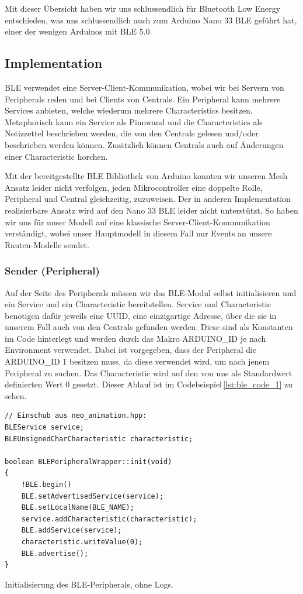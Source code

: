         Mit dieser Übersicht haben wir uns schlussendlich für Bluetooth Low Energy entschieden, was uns schlussendlich auch zum Arduino Nano 33 BLE geführt hat, einer der wenigen Arduinos mit BLE 5.0.

    \subsection{Implementation}

    BLE verwendet eine Server-Client-Kommunikation, wobei wir bei Servern von Peripherals reden und bei Clients von Centrals.
    Ein Peripheral kann mehrere Services anbieten, welche wiederum mehrere Characteristics besitzen. Metaphorisch kann ein Service als Pinnwand und die Characteristics als Notizzettel beschrieben werden, die von den Centrals gelesen und/oder beschrieben werden können. Zusätzlich können Centrals auch auf Änderungen einer Characteristic horchen.

    Mit der bereitgestellte BLE Bibliothek von Arduino konnten wir unseren Mesh Ansatz leider nicht verfolgen, jeden Mikrocontroller eine doppelte Rolle, Peripheral und Central gleichzeitig, zuzuweisen. Der in anderen Implementation realisierbare Ansatz wird auf den Nano 33 BLE leider nicht unterstützt. So haben wir uns für unser Modell auf eine klassische Server-Client-Kommunikation verständigt, wobei unser Hauptmodell in diesem Fall nur Events an unsere Rauten-Modelle sendet.


    \subsubsection{Sender (Peripheral)}

        Auf der Seite des Peripherals müssen wir das BLE-Modul selbst initialisieren und ein Service und ein Characteristic bereitstellen.
        Service und Characteristic benötigen dafür jeweils eine UUID, eine einzigartige Adresse, über die sie in unserem Fall auch von den Centrals gefunden werden. Diese sind als Konstanten im Code hinterlegt und werden durch das Makro ARDUINO\_ID je nach Environment verwendet.
        Dabei ist vorgegeben, dass der Peripheral die ARDUINO\_ID 1 besitzen muss, da diese verwendet wird, um nach jenem Peripheral zu suchen.
        Das Characteristic wird auf den von uns als Standardwert definierten Wert 0 gesetzt. Dieser Ablauf ist im Codebeispiel\,\ref{lst:ble_code_1} zu sehen.\\

        \begin{listing}
            \begin{verbatim}
// Einschub aus neo_animation.hpp:
BLEService service;
BLEUnsignedCharCharacteristic characteristic;

boolean BLEPeripheralWrapper::init(void) 
{
    !BLE.begin()
    BLE.setAdvertisedService(service);
    BLE.setLocalName(BLE_NAME);
    service.addCharacteristic(characteristic);
    BLE.addService(service);
    characteristic.writeValue(0);
    BLE.advertise();
}
            \end{verbatim}
            \caption{Initialisierung des BLE-Peripherals, ohne Logs.
            }
            \label{lst:ble_code_1}
        \end{listing}

